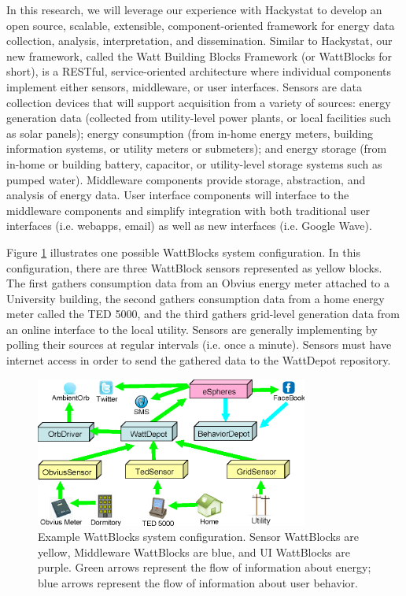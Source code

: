 In this research, we will leverage our experience with Hackystat to
develop an open source, scalable, extensible,
component-oriented framework for energy data collection, analysis,
interpretation, and dissemination.  Similar to Hackystat, our new framework, called the
Watt Building Blocks Framework (or WattBlocks for short), is a RESTful,
service-oriented architecture where individual components implement either
sensors, middleware, or user interfaces.  Sensors are data collection
devices that will support acquisition from a variety of sources: energy
generation data (collected from utility-level power plants, or local
facilities such as solar panels); energy consumption (from in-home energy
meters, building information systems, or utility meters or submeters); and
energy storage (from in-home or building battery, capacitor, or
utility-level storage systems such as pumped water).  Middleware components
provide storage, abstraction, and analysis of energy data. User interface
components will interface to the middleware components and simplify
integration with both traditional user interfaces (i.e. webapps, email) as
well as new interfaces (i.e. Google Wave).

Figure \ref{fig:WattBlocks} illustrates one possible WattBlocks system
configuration.  In this configuration, there are three WattBlock sensors
represented as yellow blocks.  The first gathers consumption data from an
Obvius energy meter attached to a University building, the second gathers
consumption data from a home energy meter called the TED 5000, and the
third gathers grid-level generation data from an online interface to the
local utility.  Sensors are generally implementing by polling their sources
at regular intervals (i.e. once a minute). Sensors must have internet
access in order to send the gathered data to the WattDepot repository.


\begin{figure}[th]
  \center
  \includegraphics[width=0.8\textwidth]{architecture.4.eps}
  \caption{\small Example WattBlocks system configuration. Sensor WattBlocks are
    yellow, Middleware WattBlocks are blue, and UI WattBlocks are purple.
    Green arrows represent the flow of information about energy; blue
    arrows represent the flow of information about user behavior.}
  \label{fig:WattBlocks}
\end{figure} 

